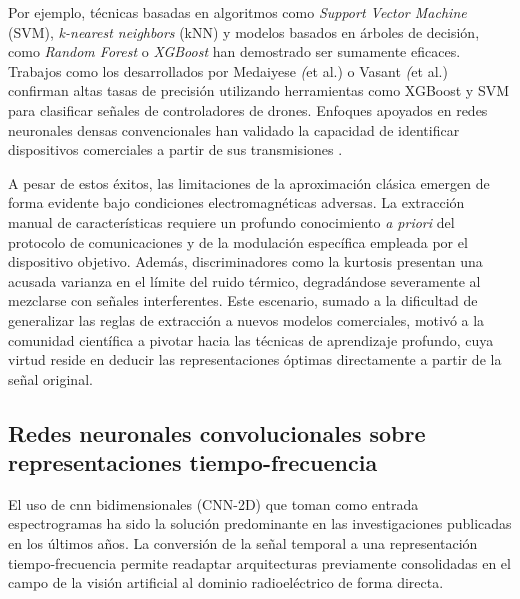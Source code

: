 Por ejemplo, técnicas basadas en algoritmos como \textit{Support Vector Machine} (SVM), \textit{k-nearest neighbors} (kNN) y modelos basados en árboles de decisión, como \textit{Random Forest} o \textit{XGBoost} han demostrado ser sumamente eficaces. Trabajos como los desarrollados por Medaiyese \textit(et al.) \cite{medaiyese_machine_2021} o Vasant \textit(et al.) \cite{vasant_ahirrao_rf-based_2024} confirman altas tasas de precisión utilizando herramientas como XGBoost y SVM para clasificar señales de controladores de drones. Enfoques apoyados en redes neuronales densas convencionales han validado la capacidad de identificar dispositivos comerciales a partir de sus transmisiones \cite{allahham_dronerf_2019, lacy_machine_2024}.

A pesar de estos éxitos, las limitaciones de la aproximación clásica emergen de forma evidente bajo condiciones electromagnéticas adversas. La extracción manual de características requiere un profundo conocimiento \textit{a priori} del protocolo de comunicaciones y de la modulación específica empleada por el dispositivo objetivo. Además, discriminadores como la kurtosis presentan una acusada varianza en el límite del ruido térmico, degradándose severamente al mezclarse con señales interferentes. Este escenario, sumado a la dificultad de generalizar las reglas de extracción a nuevos modelos comerciales, motivó a la comunidad científica a pivotar hacia las técnicas de aprendizaje profundo, cuya virtud reside en deducir las representaciones óptimas directamente a partir de la señal original.

\subsection{Redes neuronales convolucionales sobre representaciones tiempo-frecuencia}
\label{subsec:cnn_2d}
El uso de \gls{cnn} bidimensionales (CNN-2D) que toman como entrada espectrogramas ha sido la solución predominante en las investigaciones publicadas en los últimos años. La conversión de la señal temporal a una representación tiempo-frecuencia permite readaptar arquitecturas previamente consolidadas en el campo de la visión artificial al dominio radioeléctrico de forma directa.

